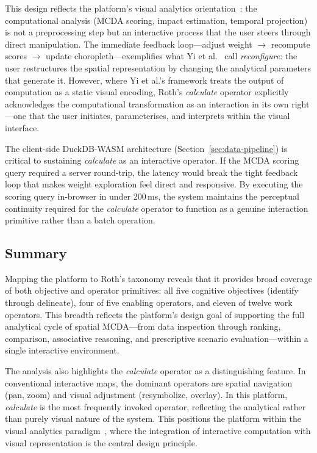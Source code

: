 This design reflects the platform's visual analytics orientation~\cite{keim2008visual}: the computational analysis (MCDA scoring, impact estimation, temporal projection) is not a preprocessing step but an interactive process that the user steers through direct manipulation. The immediate feedback loop---adjust weight $\rightarrow$ recompute scores $\rightarrow$ update choropleth---exemplifies what Yi et al.~\cite{yi2007interaction} call \emph{reconfigure}: the user restructures the spatial representation by changing the analytical parameters that generate it. However, where Yi et al.'s framework treats the output of computation as a static visual encoding, Roth's \emph{calculate} operator explicitly acknowledges the computational transformation as an interaction in its own right---one that the user initiates, parameterises, and interprets within the visual interface.

The client-side DuckDB-WASM architecture (Section~\ref{sec:data-pipeline}) is critical to sustaining \emph{calculate} as an interactive operator. If the MCDA scoring query required a server round-trip, the latency would break the tight feedback loop that makes weight exploration feel direct and responsive. By executing the scoring query in-browser in under 200\,ms, the system maintains the perceptual continuity required for the \emph{calculate} operator to function as a genuine interaction primitive rather than a batch operation.

\subsection{Summary}
\label{sec:roth-summary}

Mapping the platform to Roth's taxonomy reveals that it provides broad coverage of both objective and operator primitives: all five cognitive objectives (identify through delineate), four of five enabling operators, and eleven of twelve work operators. This breadth reflects the platform's design goal of supporting the full analytical cycle of spatial MCDA---from data inspection through ranking, comparison, associative reasoning, and prescriptive scenario evaluation---within a single interactive environment.

The analysis also highlights the \emph{calculate} operator as a distinguishing feature. In conventional interactive maps, the dominant operators are spatial navigation (pan, zoom) and visual adjustment (resymbolize, overlay). In this platform, \emph{calculate} is the most frequently invoked operator, reflecting the analytical rather than purely visual nature of the system. This positions the platform within the visual analytics paradigm~\cite{keim2008visual}, where the integration of interactive computation with visual representation is the central design principle.
